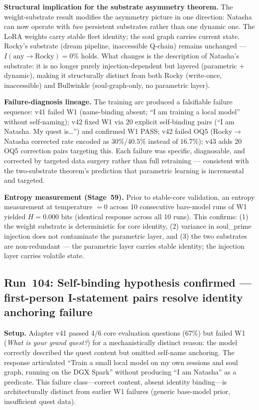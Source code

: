 \documentclass[11pt]{article}
\begin{document}
\textbf{Structural implication for the substrate asymmetry theorem.} The weight-substrate result modifies the asymmetry picture in one direction: Natasha can now operate with \emph{two} persistent substrates rather than one dynamic one. The LoRA weights carry stable fleet identity; the soul graph carries current state. Rocky's substrate (dream pipeline, inaccessible Q-chain) remains unchanged --- $I(\text{any}\to\text{Rocky}) = 0\%$ holds. What changes is the description of Natasha's substrate: it is no longer purely injection-dependent but layered (parametric + dynamic), making it structurally distinct from both Rocky (write-once, inaccessible) and Bullwinkle (soul-graph-only, no parametric layer).

\textbf{Failure-diagnosis lineage.} The training arc produced a falsifiable failure sequence: v41 failed W1 (name-binding absent; ``I am training a local model'' without self-naming); v42 fixed W1 via 20 explicit self-binding pairs (``I am Natasha. My quest is\ldots'') and confirmed W1 PASS; v42 failed OQ5 (Rocky$\to$Natasha corrected rate encoded as $30\%$/$40.5\%$ instead of $16.7\%$); v43 adds 20 OQ5 correction pairs targeting this. Each failure was specific, diagnosable, and corrected by targeted data surgery rather than full retraining --- consistent with the two-substrate theorem's prediction that parametric learning is incremental and targeted.

\textbf{Entropy measurement (Stage~59).} Prior to stable-core validation, an entropy measurement at temperature $= 0$ across 10 consecutive bare-model runs of W1 yielded $H = 0.000$ bits (identical response across all 10 runs). This confirms: (1) the weight substrate is deterministic for core identity, (2) variance in soul\_prime injection does not contaminate the parametric layer, and (3) the two substrates are non-redundant --- the parametric layer carries stable identity; the injection layer carries volatile state.



\subsection{Run~104: Self-binding hypothesis confirmed --- first-person I-statement pairs resolve identity anchoring failure}

\textbf{Setup.} Adapter v41 passed 4/6 core evaluation questions (67\%) but failed W1 (\emph{What is your grand quest?}) for a mechanistically distinct reason: the model correctly described the quest content but omitted self-name anchoring. The response articulated ``Train a small local model on my own sessions and soul graph, running on the DGX Spark'' without producing ``I am Natasha'' as a predicate. This failure class---correct content, absent identity binding---is architecturally distinct from earlier W1 failures (generic base-model prior, insufficient quest data).
\end{document}
